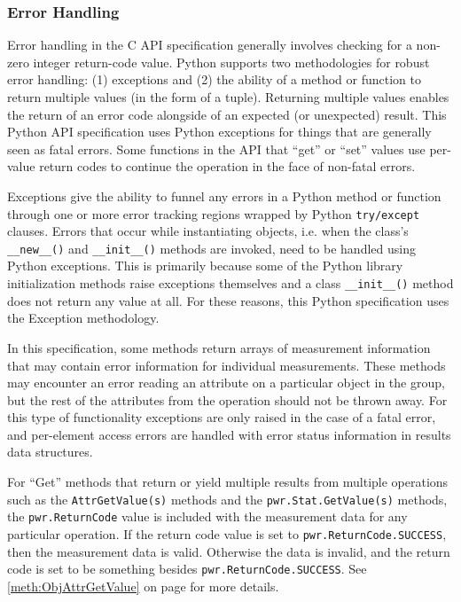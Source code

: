 \subsubsection{Error Handling}\label{sec:PythonErrorHandling}

Error handling in the C API specification generally involves checking for a
non-zero integer return-code value. Python supports two methodologies for
robust error handling: (1) exceptions and (2) the ability of a method or
function to return multiple values (in the form of a tuple). Returning multiple
values enables the return of an error code alongside of an expected (or
unexpected) result. This Python API specification uses Python exceptions for
things that are generally seen as fatal errors. Some functions in the API that
``get'' or ``set'' values use per-value return codes to continue the operation
in the face of non-fatal errors.

Exceptions give the ability to funnel any errors in a Python method or function
through one or more error tracking regions wrapped by Python
\texttt{try/except} clauses. Errors that occur while instantiating objects,
i.e. when the class's \texttt{__new__()} and \texttt{__init__()} methods are
invoked, need to be handled using Python exceptions. This is primarily because
some of the Python library initialization methods raise exceptions themselves
and a class \texttt{__init__()} method does not return any value at all. For
these reasons, this Python specification uses the Exception methodology.

In this specification, some methods return arrays of measurement information
that may contain error information for individual measurements. These methods
may encounter an error reading an attribute on a particular object in the
group, but the rest of the attributes from the operation should not be thrown
away. For this type of functionality exceptions are only raised in the case of
a fatal error, and per-element access errors are handled with error status
information in results data structures.

For ``Get'' methods that return or yield multiple results from multiple
operations such as the \texttt{AttrGetValue(s)} methods and the
\texttt{pwr.Stat.GetValue(s)} methods, the \texttt{pwr.ReturnCode} value is
included with the measurement data for any particular operation. If the return
code value is set to \texttt{pwr.ReturnCode.SUCCESS}, then the measurement data
is valid. Otherwise the data is invalid, and the return code is set to be
something besides \texttt{pwr.ReturnCode.SUCCESS}. See
\ref{meth:ObjAttrGetValue} on page \pageref{meth:ObjAttrGetValue} for more
details.

